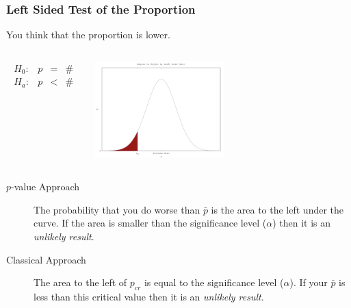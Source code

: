 \begin{frame}
  \frametitle{Left Sided Test of the Proportion}

  You think that the proportion is lower.

  \begin{columns}
    \begin{eqnarray*}
      \begin{array}{lrcl}
        H_0: & p & = & \# \\
        H_a: & p & < & \#
      \end{array}
    \end{eqnarray*}


    \includegraphics[width=5cm]{img/leftSideHypothesisTest}

  \end{columns}

  \begin{description}
  \item[$p$-value Approach] The probability that you do worse than
    $\bar{p}$ is the area to the left under the curve. If the area is
    smaller than the significance level ($\alpha$) then it is an
    \textit{unlikely result}.
  \item[Classical Approach] The area to the left of $p_{cr}$ is
    equal to the significance level ($\alpha$). If your $\bar{p}$ is
    less than this critical value then it is an \textit{unlikely
      result}.
  \end{description}


\end{frame}

